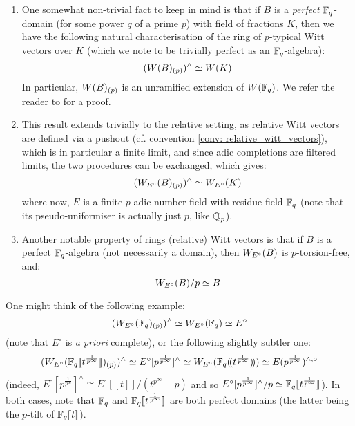             \begin{remark} \label{remark: witt_vectors_over_perfect_rings}
                \noindent
                \begin{enumerate}
                    \item One somewhat non-trivial fact to keep in mind is that if $B$ is a \textit{perfect} $\mathbb{F}_q$-domain (for some power $q$ of a prime $p$) with field of fractions $K$, then we have the following natural characterisation of the ring of $p$-typical Witt vectors over $K$ (which we note to be trivially perfect as an $\mathbb{F}_q$-algebra):
                    $$(W(B)_{(p)})^{\wedge} \simeq W(K)$$
                    In particular, $W(B)_{(p)}$ is an unramified extension of $W(\mathbb{F}_q)$. We refer the reader to \cite[Proposition 5.2]{shimomoto2014witt} for a proof.
                    \item This result extends trivially to the relative setting, as relative Witt vectors are defined via a pushout (cf. convention \ref{conv: relative_witt_vectors}), which is in particular a finite limit, and since adic completions are filtered limits, the two procedures can be exchanged, which gives:
                        $$(W_{E^{\circ}}(B)_{(p)})^{\wedge} \simeq W_{E^{\circ}}(K)$$
                    where now, $E$ is a finite $p$-adic number field with residue field $\mathbb{F}_q$ (note that its pseudo-uniformiser is actually just $p$, like $\mathbb{Q}_p$).
                    \item Another notable property of rings (relative) Witt vectors is that if $B$ is a perfect $\mathbb{F}_q$-algebra (not necessarily a domain), then $W_{E^{\circ}}(B)$ is $p$-torsion-free, and:
                        $$W_{E^{\circ}}(B)/p \simeq B$$
                \end{enumerate}
            \end{remark}
            \begin{example}
                One might think of the following example:
                    $$(W_{E^{\circ}}(\mathbb{F}_q)_{(p)})^{\wedge} \simeq W_{E^{\circ}}(\mathbb{F}_q) \simeq E^{\circ}$$
                (note that $E^{\circ}$ is \textit{a priori} complete), or the following slightly subtler one:
                    $$( W_{E^{\circ}}( \mathbb{F}_q[\![t^{\frac{1}{p^{\infty}}}]\!] )_{(p)} )^{\wedge} \simeq E^{\circ}[p^{\frac{1}{p^{\infty}}}]^{\wedge} \simeq W_{E^{\circ}}( \mathbb{F}_q(\!(t^{\frac{1}{p^{\infty}}})\!) ) \simeq E(p^{\frac{1}{p^{\infty}}})^{\wedge, \circ}$$
                (indeed, $E^{\circ}[p^{\frac{1}{p^{\infty}}}]^{\wedge} \cong E^{\circ}[\![t]\!]/(t^{p^{\infty}} - p)$ and so $E^{\circ}[p^{\frac{1}{p^{\infty}}}]^{\wedge}/p \simeq \mathbb{F}_q[\![t^{\frac{1}{p^{\infty}}}]\!]$). In both cases, note that $\mathbb{F}_q$ and $\mathbb{F}_q[\![t^{\frac{1}{p^{\infty}}}]\!]$ are both perfect domains (the latter being the $p$-tilt of $\mathbb{F}_q[\![t]\!]$).
            \end{example}
        
